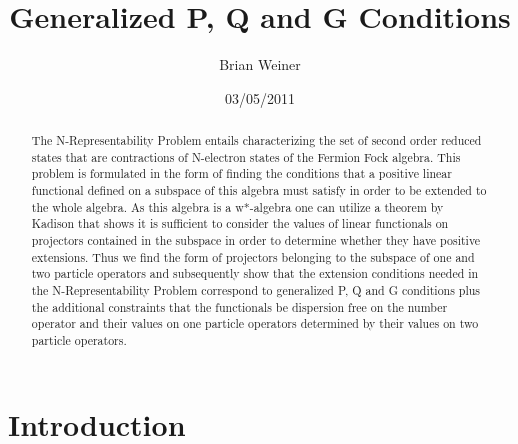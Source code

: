 \documentclass[aps,preprint,amsfonts,amssymb,showpacs,showkeys]{revtex4}%
\begin{document}
\preprint{ }
\title[P, Q and G Conditions]{Generalized P, Q and G Conditions}
\author{Brian Weiner}

\begin{abstract}
The N-Representability Problem entails characterizing the set of second order
reduced states that are contractions of N-electron states of the Fermion Fock
algebra. This problem is formulated in the form of finding the conditions that
a positive linear functional defined on a subspace of this algebra must
satisfy in order to be extended to the whole algebra. As this algebra is a
w*-algebra one can utilize a theorem by Kadison that shows it is sufficient to
consider the values of linear functionals on projectors contained in the
subspace in order to determine whether they have positive extensions. Thus we
find the form of projectors belonging to the subspace of one and two particle
operators and subsequently show that the extension conditions needed in the
N-Representability Problem correspond to generalized P, Q and G conditions
plus the additional constraints that the functionals be dispersion free on the
number operator and their values on one particle operators determined by their
values on two particle operators.

\end{abstract}
\date{03/05/2011}
\maketitle
\tableofcontents


\section{Introduction \label{Intro}}
\end{document}
